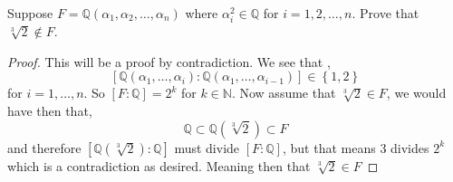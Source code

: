 \documentclass[11pt]{article}
\newenvironment{problem}[2][Problem\!]{\begin{tcolorbox}\begin{trivlist}
\item[\hskip \labelsep {\bfseries #1}\hskip \labelsep {\bfseries #2}]}{\end{trivlist}\end{tcolorbox}}
\newcommand{\qq}{\mathbb Q}   %
\newcommand{\nn}{\mathbb N}   %
\newcommand{\set}[1]{\left\{#1\right\}} %
\newcommand{\lrb}[1]{\left[#1\right]}
\begin{document}
\begin{problem}{13.2.13}
    Suppose $F = \qq(\alpha_1, \alpha_2, \dots, \alpha_n)$ where $\alpha_i ^{2}\in \qq$ for $i = 1,2,\dots,n$. Prove that $\sqrt[3]{2} \notin F$.
\end{problem}
\begin{proof}
    This will be a proof by contradiction. We see that ,
    \[\lrb{\qq(\alpha_1, \dots ,\alpha_i): \qq(\alpha_1, \dots, \alpha_{i-1})} \in \set{1,2}\]
    for $i = 1, \dots ,n$. So $[F:\qq] = 2^{k}$ for $k \in \nn$. Now assume that $\sqrt[3]{2}\in F$, we would have then that,
    \[\qq \subset \qq(\sqrt[3]{2}) \subset F\]
    and therefore $[\qq(\sqrt[3]{2}) : \qq]$ must divide  $[F: \qq]$, but that means $3$ divides $2^{k}$ which is a contradiction as desired. Meaning then that $\sqrt[3]{2}\in F$
\end{proof}
\end{document}
